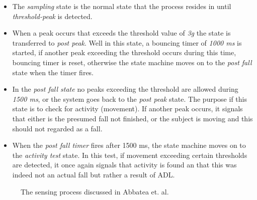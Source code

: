 \documentclass[12pt, a4paper, onecolumn]{article}
\begin{document}
	\begin{itemize}
		\item The \textit{sampling} state is the normal state that the process resides in until \textit{threshold-peak} is detected.
		
		\item When a peak occurs that exceeds the threshold value of \textit{3g} the state is transferred to \textit{post peak}. Well in this state, a bouncing timer of \textit{1000 ms} is started, if another peak exceeding the threshold occurs during this time, bouncing timer is reset, otherwise the state machine moves on to the \textit{post fall} state when the timer fires.
		
		\item In the \textit{post fall state} no peaks exceeding the threshold are allowed during \textit{1500 ms}, or the system goes back to the \textit{post peak} state. The purpose if this state is to check for activity (movement). If another peak occurs, it signals that either is the presumed fall not finished, or the subject is moving and this should not regarded as a fall. 
		
		\item When the \textit{post fall timer} fires after 1500 ms, the state machine moves on to the \textit{activity test} state. In this test, if movement exceeding certain thresholds are detected, it once again signals that activity is found an that this was indeed not an actual fall but rather a result of ADL. 
		
	\end{itemize}  
	
	
	\begin{figure}[h]
		\centering
		\caption{The sensing process discussed in Abbatea et. al.}%
		\label{fig:example}%
	\end{figure}
	
\end{document}
